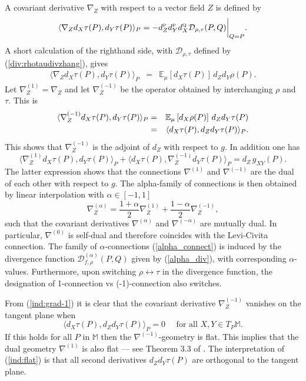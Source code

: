 \documentclass[graybox]{svmult}
\newcommand{\be}{\begin{equation}}
\newcommand{\ee}{\end{equation}}
\newcommand{\beq}{\begin{eqnarray}}
\newcommand{\eeq}{\end{eqnarray}}
\newcommand{\Mo}{\mathbb M}
\newcommand{\Eo}{\mathbb E}
\newcommand{\Ddiv}{\mathcal{D}}
\newcommand{\Dfrechet}{d}
\begin{document}
A covariant derivative $\nabla_Z$ with respect to a vector field $Z$ is defined by
\be
\langle \nabla_Z\Dfrechet_X\tau(P),\Dfrechet_Y\tau(P)\rangle_P
=
-\Dfrechet^{\mbox{\tiny P}}_Z
\Dfrechet^{\mbox{\tiny P}}_Y\Dfrechet^{\mbox{\tiny Q}}_X \Ddiv _{\rho,\tau}(P,Q)
\bigg|_{Q=P}.
\nonumber
\ee
A short calculation of the righthand side, with $\Ddiv _{\rho,\tau}$ defined by (\ref{div:rhotaudivzhang}), gives
\beq
\langle\nabla_Z\Dfrechet_X\tau(P),\Dfrechet_Y\tau(P)\rangle_P
&=&
\Eo_\mu \left[\Dfrechet_X\tau(P)\right]
\,\Dfrechet_Z\Dfrechet_Y\rho(P).
\nonumber
\eeq
Let $\nabla^{(1)}_Z=\nabla_Z$ and let $\nabla_Z^{(-1)}$ be the operator
obtained by interchanging $\rho$ and $\tau$.
This is
\beq
\langle\nabla_Z^{(-1)}\Dfrechet_X\tau(P),\Dfrechet_Y\tau(P)\rangle_P
&=&
\Eo_\mu \left[\Dfrechet_X\rho(P)\right]
\,\Dfrechet_Z\Dfrechet_Y\tau(P)\cr
&=&
\langle \Dfrechet_X\tau(P)
,\Dfrechet_Z\Dfrechet_Y\tau(P)\rangle_P.
\label{ind:grad-1}
\eeq
This shows that $\nabla_Z^{(-1)}$ is the adjoint of $\Dfrechet_Z$ with respect to $g$.
In addition one has
\be
\langle\nabla_Z^{(1)}\Dfrechet_X\tau(P),\Dfrechet_Y\tau(P)\rangle_P
+\langle\Dfrechet_X\tau(P),\nabla_Z^{(-1)}\Dfrechet_Y\tau(P)\rangle_P
=\Dfrechet_Z\, g_{XY}(P).
\label{ind:dual}
\ee
The latter expression shows that the connections $\nabla^{(1)}$
and $\nabla^{(-1)}$ are the dual of each other with respect to $g$.
The alpha-family of connections is then obtained by linear interpolation with $\alpha \in [-1,1]$
\be \label{alpha_connect}
\nabla^{(\alpha)}_Z=\frac{1+\alpha}{2}\nabla^{(1)}_Z+\frac{1-\alpha}{2}\nabla^{(-1)}_Z ,
\ee
such that the covariant derivatives $\nabla^{(\alpha)}$ and $\nabla^{(-\alpha)}$ are mutually dual. 
In particular, $\nabla^{(0)}$ is self-dual and therefore coincides with the Levi-Civita
connection. The family of $\alpha$-connections (\ref{alpha_connect}) is induced by the divergence function
$\Ddiv^{(\alpha)}_{f, \rho}(P,Q)$ given by (\ref{alpha_div}), with corresponding $\alpha$-values. Furthermore, upon switching $\rho \leftrightarrow \tau$ in the divergence function, the designation of 1-connection vs (-1)-connection also switches. 

From (\ref {ind:grad-1}) it is clear that the covariant derivative $\nabla_Z^{(-1)}$
vanishes on the tangent plane when
\be
\langle \Dfrechet_X\tau(P)
,\Dfrechet_Z\Dfrechet_Y\tau(P)\rangle_P=0
\quad\mbox{ for all }X,Y\in T_P\Mo.
\label{ind:flat}
\ee
If this holds for all $P$ in $\Mo$ then the 
$\nabla^{(-1)}$-geometry is flat.
This implies that the dual geometry $\nabla^{(1)}$ is also flat
--- see Theorem 3.3 of \cite{amarinagaoka2000}.
The interpretation of (\ref {ind:flat}) is that all second derivatives
$\Dfrechet_Z\Dfrechet_Y\tau(P)$ are orthogonal to the tangent plane.
\end{document}
